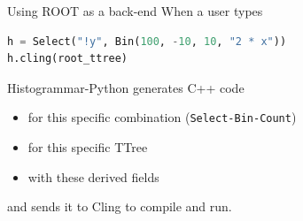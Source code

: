 \documentclass{beamer}
\begin{document}
\begin{frame}[fragile]{Using ROOT as a back-end}
When a user types

\begin{center}
\begin{minipage}{0.9\linewidth}
\begin{lstlisting}[language=python, basicstyle=\ttfamily\small]
h = Select("!y", Bin(100, -10, 10, "2 * x"))
h.cling(root_ttree)
\end{lstlisting}
\end{minipage}
\end{center}

Histogrammar-Python generates C++ code

\begin{itemize}
\item for this specific combination ({\tt\small Select-Bin-Count})
\item for this specific TTree
\item with these derived fields
\end{itemize}

and sends it to Cling to compile and run.
\end{frame}
\end{document}
